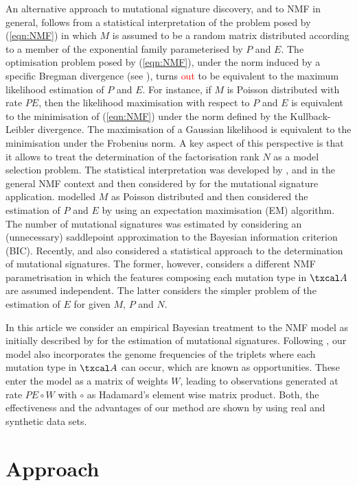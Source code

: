 \documentclass{bioinfo}
\begin{document}
An alternative approach to mutational signature discovery, and to NMF
in general, follows from a statistical interpretation of the problem
posed by (\ref{eqn:NMF}) in which $M$ is assumed to be a random matrix
distributed according to a member of the exponential family
parameterised by $P$ and $E$. The optimisation problem posed by
(\ref{eqn:NMF}), under the norm induced by a specific Bregman
divergence (see \citealp{BMD}), turns \textcolor{red}{out} to be
equivalent to the maximum likelihood estimation of $P$ and $E$.  For
instance, if $M$ is Poisson distributed with rate $PE$, then the
likelihood maximisation with respect to $P$ and $E$ is equivalent to
the minimisation of (\ref{eqn:NMF}) under the norm defined by the
Kullback-Leibler divergence. The maximisation of a Gaussian likelihood
is equivalent to the minimisation under the Frobenius norm. A key
aspect of this perspective is that it allows to treat the
determination of the factorisation rank $N$ as a model selection
problem. The statistical interpretation was developed by \cite{C},
\cite{FC} and \cite{SWK} in the general NMF context and then
considered by \cite{FICMV} for the mutational signature
application. \cite{FICMV} modelled $M$ as Poisson distributed and then
considered the estimation of $P$ and $E$ by using an expectation
maximisation (EM) algorithm. The number of mutational signatures was
estimated by considering an (unnecessary) saddlepoint approximation to
the Bayesian information criterion (BIC). Recently, \cite{STMS} and
\cite{RMHTS} also considered a statistical approach to the
determination of mutational signatures. The former, however, considers
a different NMF parametrisation in which the features composing each
mutation type in $\txcal A$ are assumed independent. The latter
considers the simpler problem of the estimation of $E$ for given $M$,
$P$ and $N$.

In this article we consider an empirical Bayesian treatment to the NMF
model as initially described by \cite{A} for the estimation of
mutational signatures. Following \cite{FICMV}, our model also
incorporates the genome frequencies of the triplets where each
mutation type in $\txcal A$ can occur, which are known as
opportunities. These enter the model as a matrix of weights $W$,
leading to observations generated at rate $PE\circ W$ with $\circ$ as
Hadamard's element wise matrix product. Both, the effectiveness and
the advantages of our method are shown by using real and synthetic
data sets.

\section{Approach}
\end{document}
